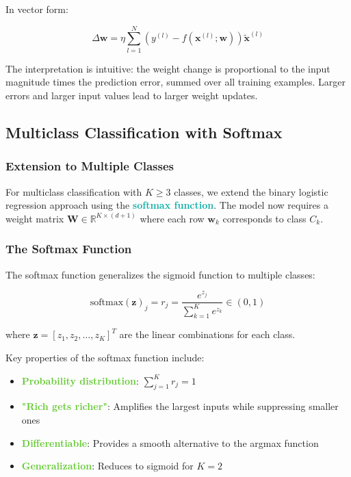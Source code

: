 \documentclass[twoside]{article}
\newcommand{\highlightbluetext}[1]{\textcolor[HTML]{09ACA6}{\textbf{#1}}}
\newcommand{\highlightgreentext}[1]{\textcolor[HTML]{62C92F}{\textbf{#1}}}
\numberwithin{equation}{section}
\begin{document}
	In vector form:

	\begin{equation}
	\label{eq:VectorWeightUpdate}
		\boxed{\Delta \mathbf{w} = \eta \sum_{l=1}^{N} \left( y^{(l)} - f(\mathbf{x}^{(l)}; \mathbf{w}) \right) \tilde{\mathbf{x}}^{(l)}}
	\end{equation}

	The interpretation is intuitive: the weight change is proportional to the input magnitude times the prediction error, summed over all training examples. Larger errors and larger input values lead to larger weight updates.

	\newpage
	\subsection{Multiclass Classification with Softmax}
	\label{subsec:MulticlassClassificationWithSoftmax}

	\subsubsection{Extension to Multiple Classes}
	\label{subsubsec:ExtensionToMultipleClasses}
	For multiclass classification with $K \geq 3$ classes, we extend the binary logistic regression approach using the \highlightbluetext{softmax function}. The model now requires a weight matrix $\mathbf{W} \in \mathbb{R}^{K \times (d+1)}$ where each row $\mathbf{w}_k$ corresponds to class $C_k$.

	\subsubsection{The Softmax Function}
	\label{subsubsec:TheSoftmaxFunction}
	The softmax function generalizes the sigmoid function to multiple classes:

	\begin{equation}
	\label{eq:SoftmaxFunction}
		\boxed{\text{softmax}(\mathbf{z})_j = r_j = \frac{e^{z_j}}{\sum_{k=1}^K e^{z_k}} \in (0,1)}
	\end{equation}

	where $\mathbf{z} = [z_1, z_2, \ldots, z_K]^T$ are the linear combinations for each class.

	Key properties of the softmax function include:
	\begin{itemize}
		\item \highlightgreentext{Probability distribution}: $\sum_{j=1}^K r_j = 1$
		\item \highlightgreentext{"Rich gets richer"}: Amplifies the largest inputs while suppressing smaller ones
		\item \highlightgreentext{Differentiable}: Provides a smooth alternative to the argmax function
		\item \highlightgreentext{Generalization}: Reduces to sigmoid for $K = 2$
	\end{itemize}
\end{document}
